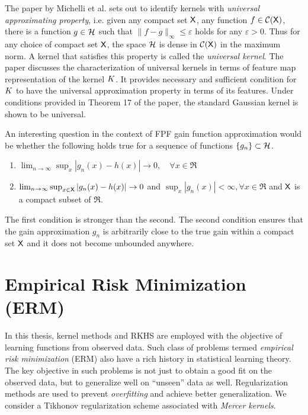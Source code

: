 The paper by Michelli et al. \cite{micchaxuzha06} sets out to identify kernels with \textit{universal approximating property}, i.e. given any compact set ${\sf X}$, any function $f \in \mathcal{C}({\sf X})$, there is a function $g \in {\cal H}$ such that $\| f - g\|_{\infty} \leq \varepsilon$ holds for any $\varepsilon > 0$. Thus for any choice of compact set ${\sf X}$, the space ${\cal H}$ is dense in $\mathcal{C}({\sf X})$ in the maximum norm. A kernel that satisfies this property is called the \textit{universal kernel}. The paper discusses the characterization of universal kernels in terms of feature map representation of the kernel $K$. It provides necessary and sufficient condition for $K$ to have the universal approximation property in terms of its features. Under conditions provided in Theorem 17 of the paper, the standard Gaussian kernel is shown to be universal. 


An interesting question in the context of FPF gain function approximation would be whether the following holds true for a sequence of functions $\{g_n\} \subset {\cal H}$.
\begin{enumerate}
\item $\lim_{n \to \infty} \sup_x |g_n(x) -h(x) | \to 0,\quad \forall x \in \Re$
\item $ \lim_{n \to \infty}\sup_{x \in {\sf X}} |g_n(x) - h(x) | \to 0$ and $\sup_x |g_n(x)| < \infty,  \forall x \in \Re$ and ${\sf X}$ is a compact subset of $\Re$. 
\end{enumerate}
The first condition is stronger than the second. The second condition ensures that the gain approximation $g_n$ is arbitrarily close to the true gain within a compact set ${\sf X}$ and it does not become unbounded anywhere. 


\section{Empirical Risk Minimization (ERM)}
\label{s:erm}
In this thesis, kernel methods and RKHS are employed with the objective of learning functions from observed data. Such class of problems termed \textit{empirical risk minimization} (ERM) also have a rich history in statistical learning theory. The key objective in such problems is not just to obtain a good fit on the observed data, but to generalize well on ``unseen'' data as well. Regularization methods are used to prevent \textit{overfitting} and achieve better generalization. We consider a Tikhonov regularization scheme \cite{tikars79} associated with \textit{Mercer kernels}.

